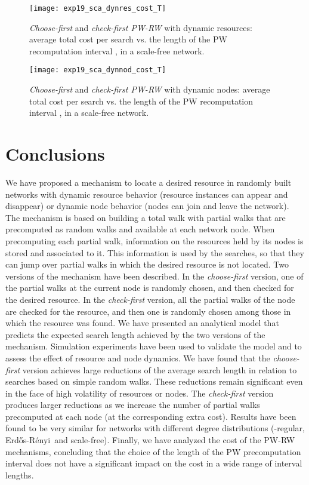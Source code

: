 \documentclass[]{elsarticle}
\newcommand{\ER}	{Erd\H{o}s-R\'{e}nyi}
\begin{document}
\begin{figure}
 \centering
 \texttt{[image: exp19\_sca\_dynres\_cost\_T]}
 \caption{\emph{Choose-first} and \emph{check-first PW-RW} with dynamic resources: average total cost per search  vs. the length of the PW recomputation interval , in a scale-free network.}
 \label{fig:sca_dynres_cost_T}
\end{figure}

\begin{figure}
 \centering
 \texttt{[image: exp19\_sca\_dynnod\_cost\_T]}
 \caption{\emph{Choose-first} and \emph{check-first PW-RW} with dynamic nodes: average total cost per search  vs. the length of the PW recomputation interval , in a scale-free network.}
 \label{fig:sca_dynnod_cost_T}
\end{figure}


\section{Conclusions}
\label{sec:conclusions}

We have proposed a mechanism to locate a desired resource in randomly built networks with dynamic resource behavior (resource instances can appear and disappear) or dynamic node behavior (nodes can join and leave the network). The mechanism is based on building a total walk with partial walks that are precomputed as random walks and available at each network node. When precomputing each partial walk, information on the resources held by its nodes is stored and associated to it. This information is used by the searches, so that they can jump over partial walks in which the desired resource is not located. Two versions of the mechanism have been described. In the \emph{choose-first} version, one of the partial walks at the current node is randomly chosen, and then checked for the desired resource. In the \emph{check-first} version, all the partial walks of the node are checked for the resource, and then one is randomly chosen among those in which the resource was found. 
We have presented an analytical model that predicts the expected search length achieved by the two versions of the mechanism. Simulation experiments have been used to validate the model and to assess the effect of resource and node dynamics. We have found that the \emph{choose-first} version achieves large reductions of the average search length in relation to searches based on simple random walks. These reductions remain significant even in the face of high volatility of resources or nodes. The \emph{check-first} version produces larger reductions as we increase the number of partial walks precomputed at each node (at the corresponding extra cost). Results have been found to be very similar for networks with different degree distributions (-regular, \ER\ and scale-free).
Finally, we have analyzed the cost of the PW-RW mechanisms, concluding that the choice of the length of the PW precomputation interval does not have a significant impact on the cost in a wide range of interval lengths. 
\end{document}
